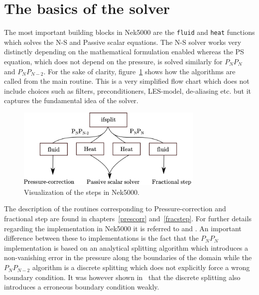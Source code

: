 \section{The basics of the solver}
The most important building blocks in Nek5000 are the \verb|fluid| and \verb|heat| functions which solves the 
N-S and Passive scalar equations. The N-S solver works very distinctly depending on the mathematical formulation
enabled whereas the PS equation, which does not depend on the pressure, is solved similarly for $P_NP_N$ and $P_NP_{N-2}$. 
For the sake of clarity, figure~\ref{fig:files} shows how the algorithms are called from the main routine.
This is a very simplified flow chart which does not include choices such as filters, preconditioners, LES-model, 
de-aliasing etc. but it captures the fundamental idea of the solver. 
%
\begin{figure}[h]
	\centering
	\includegraphics[width=0.8\textwidth]{Figures/Nek.png}
	\caption{Visualization of the steps in Nek5000.}
	\label{fig:files}
\end{figure}
%

The description of the routines corresponding to Pressure-correction and fractional step are found in 
chapters~\ref{prescorr} and~\ref{fracstep}. For further details regarding the 
implementation in Nek5000 it is referred to \cite{Fischer_hybridschwarz-multigrid}
and \cite{TomboulidesPnPn}. An important difference between these to implementations is the fact that the $P_NP_N$ 
implementation is based on an analytical splitting algorithm which introduces a non-vanishing error in the pressure along the boundaries of the 
domain while the $P_NP_{N-2}$ algorithm is a discrete splitting which does not explicitly force a wrong boundary condition.
It was however shown in~\cite{Guermond2006} that the discrete splitting also introduces a erroneous boundary condition weakly. 

